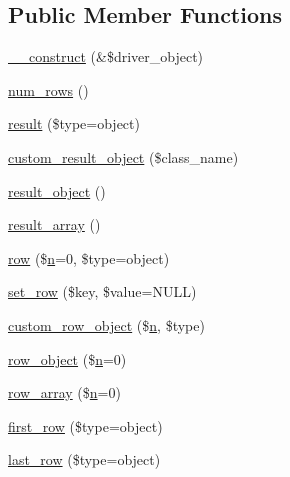 \subsection*{Public Member Functions}
\begin{DoxyCompactItemize}
\item 
\mbox{\hyperlink{class_c_i___d_b__result_a8e093c8b6e5733bc3f306385ee426ab7}{\+\_\+\+\_\+construct}} (\&\$driver\+\_\+object)
\item 
\mbox{\hyperlink{class_c_i___d_b__result_a218657c303ee499b97710ab0cd2f5d6e}{num\+\_\+rows}} ()
\item 
\mbox{\hyperlink{class_c_i___d_b__result_a86bc3a5f1694241cf86a6fd754553884}{result}} (\$type=\textquotesingle{}object\textquotesingle{})
\item 
\mbox{\hyperlink{class_c_i___d_b__result_a5ac3523f878efb629fae30a7d9156e77}{custom\+\_\+result\+\_\+object}} (\$class\+\_\+name)
\item 
\mbox{\hyperlink{class_c_i___d_b__result_a266a17f340dab35b8f2858931ff772a2}{result\+\_\+object}} ()
\item 
\mbox{\hyperlink{class_c_i___d_b__result_a444f7dd61bfbe3931a7188adad61feae}{result\+\_\+array}} ()
\item 
\mbox{\hyperlink{class_c_i___d_b__result_a43764449dacaf9b61bbd1efee9cdb256}{row}} (\$\mbox{\hyperlink{cli_2error__php_8php_a2e6b16bbc42094e4c51ade3c10afdcf1}{n}}=0, \$type=\textquotesingle{}object\textquotesingle{})
\item 
\mbox{\hyperlink{class_c_i___d_b__result_a77628e90fac65184ec9f583e7c30a48a}{set\+\_\+row}} (\$key, \$value=N\+U\+LL)
\item 
\mbox{\hyperlink{class_c_i___d_b__result_a223538c34395626655fd483f3a55e653}{custom\+\_\+row\+\_\+object}} (\$\mbox{\hyperlink{cli_2error__php_8php_a2e6b16bbc42094e4c51ade3c10afdcf1}{n}}, \$type)
\item 
\mbox{\hyperlink{class_c_i___d_b__result_a0bd3520c57f5cb192bdfaeed1f597c0a}{row\+\_\+object}} (\$\mbox{\hyperlink{cli_2error__php_8php_a2e6b16bbc42094e4c51ade3c10afdcf1}{n}}=0)
\item 
\mbox{\hyperlink{class_c_i___d_b__result_a8dbff471ffdaf617d49189f8636e4f81}{row\+\_\+array}} (\$\mbox{\hyperlink{cli_2error__php_8php_a2e6b16bbc42094e4c51ade3c10afdcf1}{n}}=0)
\item 
\mbox{\hyperlink{class_c_i___d_b__result_a9d7ddad4b02edf86c4f1ec27c0c8a2d7}{first\+\_\+row}} (\$type=\textquotesingle{}object\textquotesingle{})
\item 
\mbox{\hyperlink{class_c_i___d_b__result_a2c420342d5b577d91b6b993be86f68c0}{last\+\_\+row}} (\$type=\textquotesingle{}object\textquotesingle{})

\end{DoxyCompactItemize}
